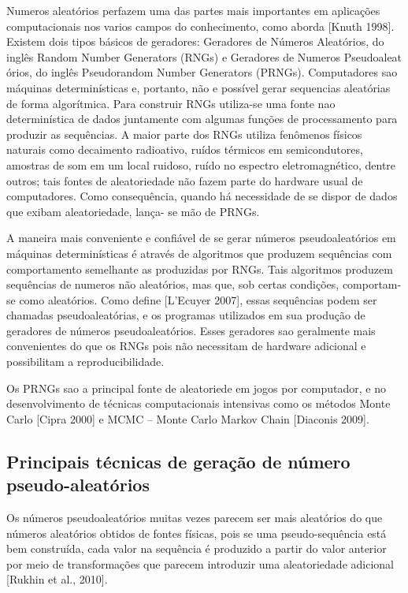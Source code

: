 \documentclass[a4paper, 12pt, english]{article}
\begin{document}
Numeros aleatórios perfazem uma das partes mais importantes em aplicações computacionais nos varios campos do conhecimento, como aborda [Knuth 1998]. Existem dois tipos básicos de geradores: Geradores de Números Aleatórios, do inglês Random Number Generators (RNGs) e Geradores de Numeros Pseudoaleat órios, do inglês Pseudorandom Number Generators (PRNGs). Computadores sao máquinas determinísticas e, portanto,
não e possível gerar sequencias aleatórias de forma algorítmica. Para construir RNGs utiliza-se uma fonte nao determinística de dados juntamente com algumas funções de 
processamento para produzir as sequências. A maior parte dos RNGs utiliza fenômenos físicos naturais como decaimento radioativo, ruídos térmicos em semicondutores, amostras de som em um local ruidoso, ruído no espectro eletromagnético, dentre outros; tais 
fontes de aleatoriedade não fazem parte do hardware usual de computadores. Como consequência, quando há necessidade de se dispor de dados que exibam aleatoriedade, lança-
se mão de PRNGs.

A maneira mais conveniente e confiável de se gerar números pseudoaleatórios em máquinas determinísticas é através de algoritmos que produzem sequências com comportamento semelhante as produzidas por RNGs. Tais algoritmos produzem sequências de 
numeros não aleatórios, mas que, sob certas condições, comportam-se como aleatórios. Como define [L’Ecuyer 2007], essas sequências podem ser chamadas pseudoaleatórias,
e os programas utilizados em sua produção de geradores de números pseudoaleatórios. Esses geradores sao geralmente mais convenientes do que os RNGs pois não necessitam de hardware adicional e possibilitam a reproducibilidade.

Os PRNGs sao a principal fonte de aleatoriede em jogos por computador, e no desenvolvimento de técnicas computacionais intensivas como os métodos Monte Carlo [Cipra 2000] e MCMC – Monte Carlo Markov Chain [Diaconis 2009].



\subsection{Principais técnicas de geração de número pseudo-aleatórios}

Os números pseudoaleatórios muitas vezes parecem ser mais aleatórios do que números
aleatórios obtidos de fontes físicas, pois se uma pseudo-sequência está bem construída,
cada valor na sequência é produzido a partir do valor anterior por meio de transformações
que parecem introduzir uma aleatoriedade adicional [Rukhin et al., 2010].
\end{document}
